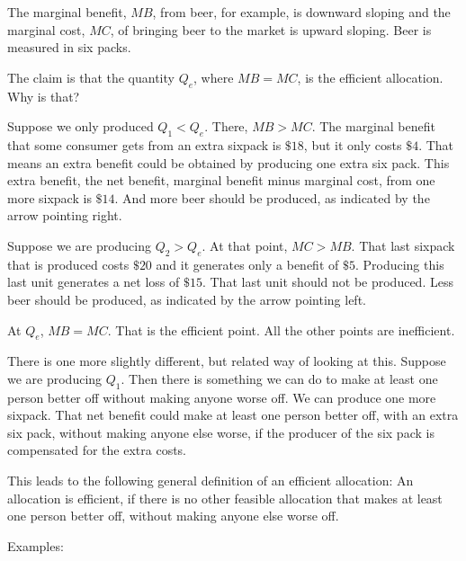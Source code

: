 \documentclass[
]{book}
\begin{document}
The marginal benefit, \(MB\), from beer, for example, is downward sloping and the marginal cost, \(MC\), of bringing beer to the market is upward sloping. Beer is measured in six packs.

The claim is that the quantity \(Q_e\), where \(MB = MC\), is the efficient allocation. Why is that?

Suppose we only produced \(Q_1 < Q_e\). There, \(MB > MC\). The marginal benefit that some consumer gets from an extra sixpack is \(\$18\), but it only costs \(\$4\). That means an extra benefit could be obtained by producing one extra six pack. This extra benefit, the net benefit, marginal benefit minus marginal cost, from one more sixpack is \(\$14\). And more beer should be produced, as indicated by the arrow pointing right.

Suppose we are producing \(Q_2 > Q_e\). At that point, \(MC > MB\). That last sixpack that is produced costs \(\$20\) and it generates only a benefit of \(\$5\). Producing this last unit generates a net loss of \(\$15\). That last unit should not be produced. Less beer should be produced, as indicated by the arrow pointing left.

At \(Q_e\), \(MB = MC\). That is the efficient point. All the other points are inefficient.

There is one more slightly different, but related way of looking at this. Suppose we are producing \(Q_1\). Then there is something we can do to make at least one person better off without making anyone worse off. We can produce one more sixpack. That net benefit could make at least one person better off, with an extra six pack, without making anyone else worse, if the producer of the six pack is compensated for the extra costs.

This leads to the following general definition of an efficient allocation: An allocation is efficient, if there is no other feasible allocation that makes at least one person better off, without making anyone else worse off.

Examples:
\end{document}
